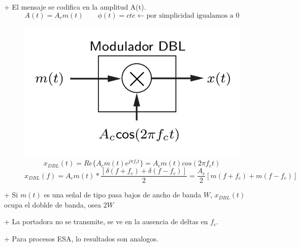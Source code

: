 \documentclass[a4paper, 10pt]{article}
\begin{document}
+ El mensaje se codifica en la amplitud A(t). $$ A(t) = A_c m(t) \quad\quad \phi(t)= cte \leftarrow \text{por simplicidad igualamos a 0}$$

\begin{figure}[!h]
    \centering
    \includegraphics[scale = 0.5]{./modulador.png}
    $$x_{DBL}(t) = Re \{ A_c m(t) e^{j \pi f_ct} \} = A_c m(t) cos(2 \pi f_c t)$$
    $$ x_{DBL}(f) = A_c m(t) * \frac{[\delta(f+f_c) + \delta(f-f_c)]}{2} = \frac{A_c}{2} [m(f+f_c) + m(f-f_c)] $$
\end{figure}

+ Si $m(t)$ es una señal de tipo pasa bajos de ancho de banda $W$, $x_{DBL}(t)$ ocupa el doblde de banda, osea $2W$

+ La portadora no se transmite, se ve en la ausencia de deltas en $f_c$.

+ Para procesos ESA, lo resultados son analogos.
\end{document}
